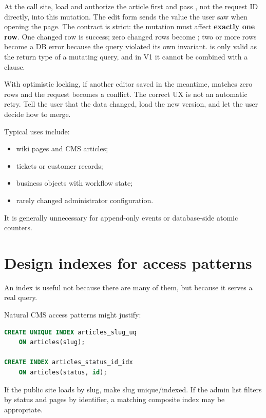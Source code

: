 At the call site, load and authorize the article first and pass , not the request ID directly, into this mutation. The edit form sends the  value the user saw when opening the page. The  contract is strict: the mutation must affect \textbf{exactly one row}. One changed row is success; zero changed rows become ; two or more rows become a DB error because the query violated its own invariant.  is only valid as the return type of a mutating query, and in V1 it cannot be combined with a  clause.

With optimistic locking, if another editor saved in the meantime,  matches zero rows and the request becomes a conflict. The correct UX is not an automatic retry. Tell the user that the data changed, load the new version, and let the user decide how to merge.

Typical uses include:

\begin{itemize}
\item wiki pages and CMS articles;
\item tickets or customer records;
\item business objects with workflow state;
\item rarely changed administrator configuration.
\end{itemize}

It is generally unnecessary for append-only events or database-side atomic counters.

\section{Design indexes for access patterns}

An index is useful not because there are many of them, but because it serves a real query.

Natural CMS access patterns might justify:

\begin{lstlisting}[language=SQL]
CREATE UNIQUE INDEX articles_slug_uq
    ON articles(slug);

CREATE INDEX articles_status_id_idx
    ON articles(status, id);
\end{lstlisting}

If the public site loads by slug, make slug unique/indexed. If the admin list filters by status and pages by identifier, a matching composite index may be appropriate.

